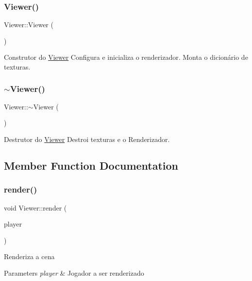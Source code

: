 \subsubsection{\texorpdfstring{Viewer()}{Viewer()}}
{\footnotesize\ttfamily Viewer\+::\+Viewer (\begin{DoxyParamCaption}{ }\end{DoxyParamCaption})}



Construtor do \hyperlink{classViewer}{Viewer} Configura e inicializa o renderizador. Monta o dicionário de texturas. 

\mbox{\label{classViewer_a324e5a6a1532fe5eac3f3b0e4792b2da}} 
\subsubsection{\texorpdfstring{$\sim$\+Viewer()}{~Viewer()}}
{\footnotesize\ttfamily Viewer\+::$\sim$\+Viewer (\begin{DoxyParamCaption}{ }\end{DoxyParamCaption})}



Destrutor do \hyperlink{classViewer}{Viewer} Destroi texturas e o Renderizador. 



\subsection{Member Function Documentation}
\mbox{\label{classViewer_a335d914ec8088b5917df9ec465f7a7aa}} 
\subsubsection{\texorpdfstring{render()}{render()}}
{\footnotesize\ttfamily void Viewer\+::render (\begin{DoxyParamCaption}\item[{\hyperlink{classPlayer}{Player} \&}]{player }\end{DoxyParamCaption})}

Renderiza a cena 
\begin{DoxyParams}{Parameters}
{\em player} & Jogador a ser renderizado \\
\hline
\end{DoxyParams}
\mbox{\label{classViewer_abf19deab378a650856e92ab4f4e42126}} 
